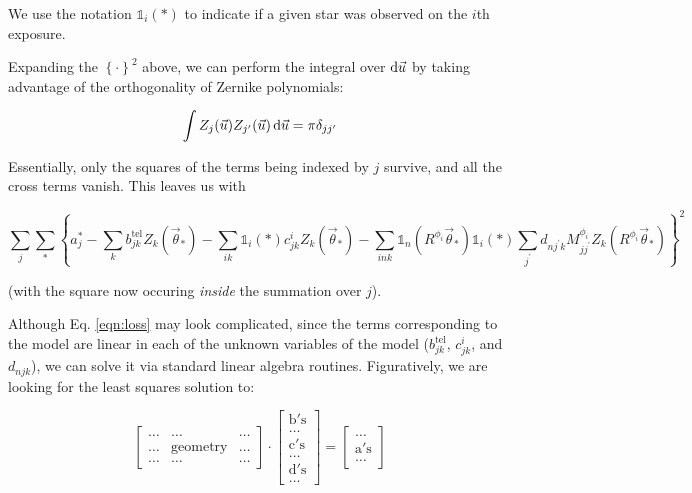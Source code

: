 \documentclass{article}
\begin{document}
We use the notation $\mathbb{1}_i(\ast)$ to indicate if a given star was
observed on the $i$th exposure.

Expanding the $\left\{\cdot\right\}^2$ above, we can perform the integral over
$\dif{\vec{u}}$ by taking advantage of the orthogonality of Zernike polynomials:

\begin{equation}
    \int Z_j(\vec{u}) Z_{j^\prime}(\vec{u}) \dif \vec{u} = \pi \delta_{j j^\prime}
\end{equation}

Essentially, only the squares of the terms being indexed by $j$ survive, and all
the cross terms vanish.  This leaves us with

\begin{equation}
    \sum_j \sum_{\ast}
    \left\{a_j^\ast
    - \sum_{k} b^\mathrm{tel}_{jk} Z_k(\vec{\theta}_\ast)
    - \sum_{ik} \mathbb{1}_i(\ast) c^i_{jk} Z_k(\vec{\theta}_\ast)
    - \sum_{ink} \mathbb{1}_n(R^{\phi_i} \vec{\theta}_\ast) \mathbb{1}_i(\ast) \sum_{j^\prime} d_{n j^\prime k} M^{\phi_i}_{j j^\prime} Z_k(R^{\phi_i} \vec{\theta}_\ast)
    \right\}^2
    \label{eqn:loss}
\end{equation}

(with the square now occuring \textit{inside} the summation over $j$).

Although Eq. \ref{eqn:loss} may look complicated, since the terms corresponding
to the model are linear in each of the unknown variables of the model
($b^\mathrm{tel}_{jk}$, $c^i_{jk}$, and $d_{njk}$), we can solve it via standard
linear algebra routines.  Figuratively, we are looking for the least squares
solution to:

\begin{equation}
  \begin{bmatrix}
    \dots & \dots & \dots \\
    \dots & \mathrm{geometry} & \dots \\
    \dots & \dots & \dots
  \end{bmatrix}
  \cdot
  \begin{bmatrix}
    \mathrm{b's} \\
    \dots \\
    \mathrm{c's} \\
    \dots \\
    \mathrm{d's} \\
    \dots
  \end{bmatrix}
  =
  \begin{bmatrix}
    \dots \\
    \mathrm{a's} \\
    \dots
  \end{bmatrix}
  \label{eqn:matrix}
\end{equation}
\end{document}
